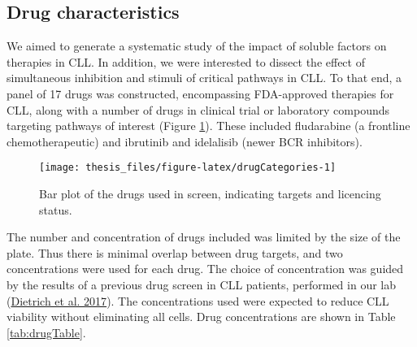 \documentclass[11pt, a4paper, twosided]{book}
\begin{document}
\hypertarget{drug-characteristics}{%
\subsection{Drug characteristics}\label{drug-characteristics}}

We aimed to generate a systematic study of the impact of soluble factors on therapies in CLL. In addition, we were interested to dissect the effect of simultaneous inhibition and stimuli of critical pathways in CLL. To that end, a panel of 17 drugs was constructed, encompassing FDA-approved therapies for CLL, along with a number of drugs in clinical trial or laboratory compounds targeting pathways of interest (Figure \ref{fig:drugCategories}). These included fludarabine (a frontline chemotherapeutic) and ibrutinib and idelalisib (newer BCR inhibitors).


\begin{figure}

{\centering \texttt{[image: thesis\_files/figure-latex/drugCategories-1]} 

}

\caption{Bar plot of the drugs used in screen, indicating targets and licencing status.}\label{fig:drugCategories}
\end{figure}
The number and concentration of drugs included was limited by the size of the plate. Thus there is minimal overlap between drug targets, and two concentrations were used for each drug. The choice of concentration was guided by the results of a previous drug screen in CLL patients, performed in our lab (\protect\hyperlink{ref-JCIpaper}{Dietrich et al. 2017}). The concentrations used were expected to reduce CLL viability without eliminating all cells. Drug concentrations are shown in Table \ref{tab:drugTable}.
\end{document}
